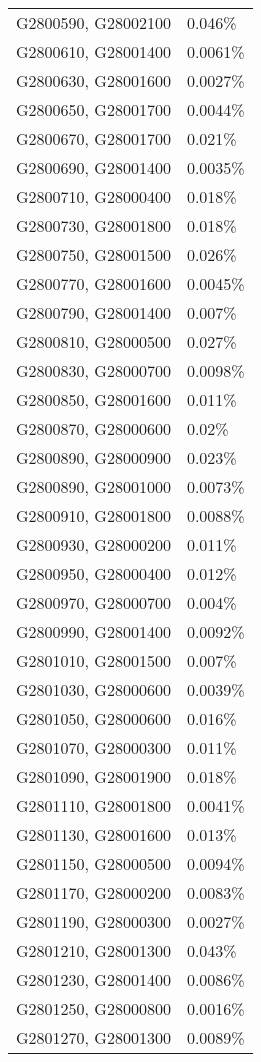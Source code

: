 \begin{longtable}[]{@{}ll@{}}
G2800590, G28002100 & 0.046\% \\
G2800610, G28001400 & 0.0061\% \\
G2800630, G28001600 & 0.0027\% \\
G2800650, G28001700 & 0.0044\% \\
G2800670, G28001700 & 0.021\% \\
G2800690, G28001400 & 0.0035\% \\
G2800710, G28000400 & 0.018\% \\
G2800730, G28001800 & 0.018\% \\
G2800750, G28001500 & 0.026\% \\
G2800770, G28001600 & 0.0045\% \\
G2800790, G28001400 & 0.007\% \\
G2800810, G28000500 & 0.027\% \\
G2800830, G28000700 & 0.0098\% \\
G2800850, G28001600 & 0.011\% \\
G2800870, G28000600 & 0.02\% \\
G2800890, G28000900 & 0.023\% \\
G2800890, G28001000 & 0.0073\% \\
G2800910, G28001800 & 0.0088\% \\
G2800930, G28000200 & 0.011\% \\
G2800950, G28000400 & 0.012\% \\
G2800970, G28000700 & 0.004\% \\
G2800990, G28001400 & 0.0092\% \\
G2801010, G28001500 & 0.007\% \\
G2801030, G28000600 & 0.0039\% \\
G2801050, G28000600 & 0.016\% \\
G2801070, G28000300 & 0.011\% \\
G2801090, G28001900 & 0.018\% \\
G2801110, G28001800 & 0.0041\% \\
G2801130, G28001600 & 0.013\% \\
G2801150, G28000500 & 0.0094\% \\
G2801170, G28000200 & 0.0083\% \\
G2801190, G28000300 & 0.0027\% \\
G2801210, G28001300 & 0.043\% \\
G2801230, G28001400 & 0.0086\% \\
G2801250, G28000800 & 0.0016\% \\
G2801270, G28001300 & 0.0089\% \\

\end{longtable}
